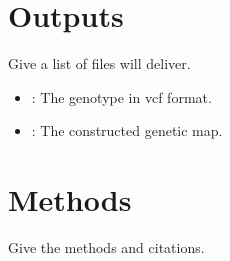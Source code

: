 \documentclass[9pt,twocolumn]{report}
\begin{document}
\section{Outputs}
Give a list of files will deliver.
\begin{itemize}
\renewcommand{\labelenumi}{\alph{enumi}}
		\item \textbf{}: The genotype in vcf format.
		\item \textbf{}: The constructed genetic map.
\end{itemize}


\section{Methods}
Give the methods and citations.


\end{document}
